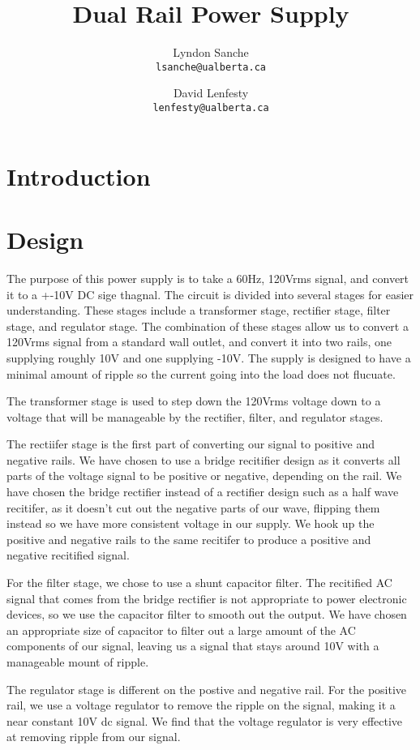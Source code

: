 \documentclass{article}
\title{Dual Rail Power Supply}
\author{
    Lyndon Sanche\\
    \texttt{lsanche@ualberta.ca}
    \and
    David Lenfesty\\
    \texttt{lenfesty@ualberta.ca}
}
\begin{document}
\maketitle
\newpage
\tableofcontents

\section{Introduction}

\section{Design}
The purpose of this power supply is to take a 60Hz, 120Vrms signal, and convert it to a +-10V DC sige thagnal. The circuit is divided into
several stages for easier understanding. These stages include a transformer stage, rectifier stage, filter stage, and regulator stage. The combination 
of these stages allow us to convert a 120Vrms signal from a standard wall outlet, and convert it into two rails, one supplying roughly 10V and one supplying -10V. 
The supply is designed to have a minimal amount of ripple so the current going into the load does not flucuate.

The transformer stage is used to step down the 120Vrms voltage down to a voltage that will be manageable by the rectifier, filter, and regulator stages.

The rectiifer stage is the first part of converting our signal to positive and negative rails. We have chosen to use a bridge recitifier design as it converts all parts of the voltage signal 
to be positive or negative, depending on the rail. We have chosen the bridge rectifier instead of a rectifier design such as a half wave recitifer, as it doesn't cut out the negative parts of our wave, flipping them instead 
so we have more consistent voltage in our supply. We hook up the positive and negative rails to the same recitifer to produce a positive and negative recitified signal.

For the filter stage, we chose to use a shunt capacitor filter. The recitified AC signal that comes from the bridge rectifier is not appropriate to power electronic devices, so we use the capacitor filter to smooth out the output. We have chosen 
an appropriate size of capacitor to filter out a large amount of the AC components of our signal, leaving us a signal that stays around 10V with a manageable mount of ripple.

The regulator stage is different on the postive and negative rail. For the positive rail, we use a voltage regulator to remove the ripple on the signal, making it a near constant 10V dc signal. We find that the voltage regulator is very effective at removing 
ripple from our signal.
\end{document}
